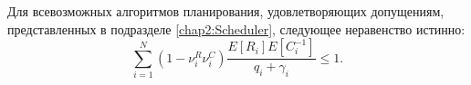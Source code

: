 \begin{lemma}
\label{lem:GeneralConstrain}
Для всевозможных алгоритмов планирования, удовлетворяющих допущениям, представленных в подразделе \ref{chap2:Scheduler}, следующее неравенство истинно:
\emph{
\begin{equation}
	\label{eq:GeneralConstrain}
	\sum\limits_{i=1}^{N} {\left(1-\nu^R_i\nu^C_i\right)\frac{E[R_i]E[C_i^{-1}]}{q_i + \gamma_i}} \leq 1.
\end{equation}
}
\end{lemma}

